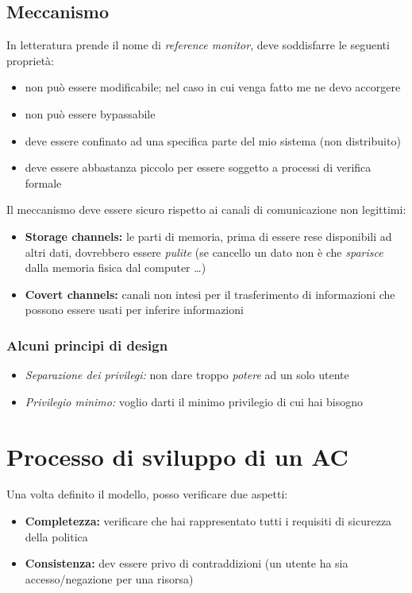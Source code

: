 \documentclass{report}
\begin{document}
\subsection{Meccanismo}
In letteratura prende il nome di \textit{reference monitor}, deve soddisfarre le 
seguenti proprietà:
\begin{itemize}
    \item non può essere modificabile; nel caso in cui venga fatto me ne devo accorgere 
    \item non può essere bypassabile 
    \item deve essere confinato ad una specifica parte del mio sistema (non distribuito)
    \item deve essere abbastanza piccolo per essere soggetto a processi di verifica formale
\end{itemize}

\noindent Il meccanismo deve essere sicuro rispetto ai canali di comunicazione non 
legittimi:
\begin{itemize}
    \item \textbf{Storage channels:} le parti di memoria, prima di essere rese disponibili 
    ad altri dati, dovrebbero essere \textit{pulite} (se cancello un dato non è che \textit{sparisce} dalla 
    memoria fisica dal computer \dots)
    \item \textbf{Covert channels:} canali non intesi per il trasferimento di informazioni
    che possono essere usati per inferire informazioni
\end{itemize}

\subsubsection{Alcuni principi di design}
\begin{itemize}
    \item \textit{Separazione dei privilegi:} non dare troppo \textit{potere} ad un solo utente 
    \item \textit{Privilegio minimo:} voglio darti il minimo privilegio di cui hai bisogno
\end{itemize}

\section{Processo di sviluppo di un AC}
Una volta definito il modello, posso verificare due aspetti:
\begin{itemize}
    \item \textbf{Completezza:} verificare che hai rappresentato tutti i requisiti di sicurezza della politica
    \item \textbf{Consistenza:} dev essere privo di contraddizioni (un utente ha sia accesso/negazione per una risorsa)
\end{itemize}
\end{document}
